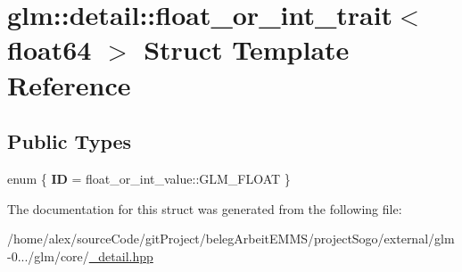 \hypertarget{structglm_1_1detail_1_1float__or__int__trait_3_01float64_01_4}{\section{glm\-:\-:detail\-:\-:float\-\_\-or\-\_\-int\-\_\-trait$<$ float64 $>$ Struct Template Reference}
\label{structglm_1_1detail_1_1float__or__int__trait_3_01float64_01_4}
}
\subsection*{Public Types}
\begin{DoxyCompactItemize}
\item 
enum \{ {\bfseries I\-D} = float\-\_\-or\-\_\-int\-\_\-value\-:\-:G\-L\-M\-\_\-\-F\-L\-O\-A\-T
 \}
\end{DoxyCompactItemize}


The documentation for this struct was generated from the following file\-:\begin{DoxyCompactItemize}
\item 
/home/alex/source\-Code/git\-Project/beleg\-Arbeit\-E\-M\-M\-S/project\-Sogo/external/glm-\/0.../glm/core/\hyperlink{__detail_8hpp}{\-\_\-detail.\-hpp}\end{DoxyCompactItemize}
